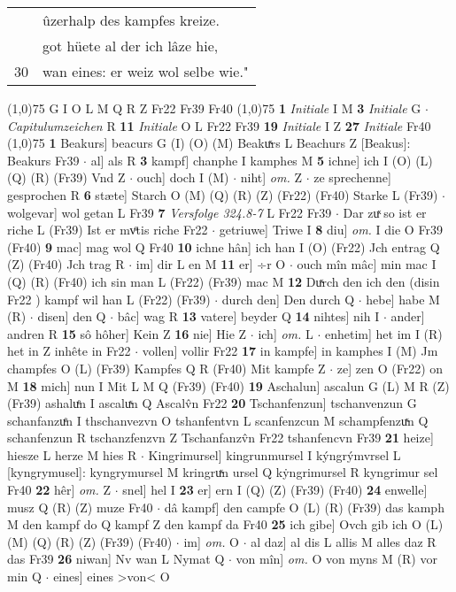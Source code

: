 \documentclass[8pt,a4paper,notitlepage]{article}
\begin{document}
\begin{table}[ht]
\begin{minipage}[t]{0.5\linewidth}
\begin{tabular}{rl}
 & ûzerhalp des kampfes kreize.\\ 
 & got hüete al der ich lâze hie,\\ 
30 & wan eines: er weiz wol selbe wie."\\ 
\end{tabular}
\scriptsize
\line(1,0){75} \newline
G I O L M Q R Z Fr22 Fr39 Fr40 \newline
\line(1,0){75} \newline
\textbf{1} \textit{Initiale} I M  \textbf{3} \textit{Initiale} G   $\cdot$ \textit{Capitulumzeichen} R  \textbf{11} \textit{Initiale} O L Fr22 Fr39  \textbf{19} \textit{Initiale} I Z  \textbf{27} \textit{Initiale} Fr40  \newline
\line(1,0){75} \newline
\textbf{1} Beakurs] beacurs G (I) (O) (M) Beakuͯrs L Beachurs Z [Beakus]: Beakurs Fr39  $\cdot$ al] als R \textbf{3} kampf] chanphe I kamphes M \textbf{5} ichne] ich I (O) (L) (Q) (R) (Fr39) Vnd Z  $\cdot$ ouch] doch I (M)  $\cdot$ niht] \textit{om.} Z  $\cdot$ ze sprechenne] gesprochen R \textbf{6} stæte] Starch O (M) (Q) (R) (Z) (Fr22) (Fr40) Starke L (Fr39)  $\cdot$ wolgevar] wol getan L Fr39 \textbf{7} \textit{Versfolge 324.8-7} L Fr22 Fr39   $\cdot$ Dar zuͯ so ist er riche L (Fr39) Ist er mvͦtis riche Fr22  $\cdot$ getriuwe] Triwe I \textbf{8} diu] \textit{om.} I die O Fr39 (Fr40) \textbf{9} mac] mag wol Q Fr40 \textbf{10} ichne hân] ich han I (O) (Fr22) Jch entrag Q (Z) (Fr40) Jch trag R  $\cdot$ im] dir L en M \textbf{11} er] ÷r O  $\cdot$ ouch mîn mâc] min mac I (Q) (R) (Fr40) ich sin man L (Fr22) (Fr39) mac M \textbf{12} Duͯrch den ich den (disin Fr22 ) kampf wil han L (Fr22) (Fr39)  $\cdot$ durch den] Den durch Q  $\cdot$ hebe] habe M (R)  $\cdot$ disen] den Q  $\cdot$ bâc] wag R \textbf{13} vatere] beyder Q \textbf{14} nihtes] nih I  $\cdot$ ander] andren R \textbf{15} sô hôher] Kein Z \textbf{16} nie] Hie Z  $\cdot$ ich] \textit{om.} L  $\cdot$ enhetim] het im I (R) het in Z inhête in Fr22  $\cdot$ vollen] vollir Fr22 \textbf{17} in kampfe] in kamphes I (M) Jm champfes O (L) (Fr39) Kampfes Q R (Fr40) Mit kampfe Z  $\cdot$ ze] zen O (Fr22) on M \textbf{18} mich] nun I Mit L M Q (Fr39) (Fr40) \textbf{19} Aschalun] ascalun G (L) M R (Z) (Fr39) ashaluͤn I ascaluͯn Q Ascalv̂n Fr22 \textbf{20} Tschanfenzun] tschanvenzun G schanfanzuͤn I thschanvezvn O tshanfentvn L scanfenzcun M schampfenzuͯn Q schanfenzun R tschanzfenzvn Z Tschanfanzv̂n Fr22 tshanfencvn Fr39 \textbf{21} heize] hiesze L herze M hies R  $\cdot$ Kingrimursel] kingrunmursel I kýngrýmvrsel L [kyngrymusel]: kyngrymursel M kringruͯn ursel Q kẏngrimursel R kyngrimur sel Fr40 \textbf{22} hêr] \textit{om.} Z  $\cdot$ snel] hel I \textbf{23} er] ern I (Q) (Z) (Fr39) (Fr40) \textbf{24} enwelle] musz Q (R) (Z) muze Fr40  $\cdot$ dâ kampf] den campfe O (L) (R) (Fr39) das kamph M den kampf do Q kampf Z den kampf da Fr40 \textbf{25} ich gibe] Ovch gib ich O (L) (M) (Q) (R) (Z) (Fr39) (Fr40)  $\cdot$ im] \textit{om.} O  $\cdot$ al daz] al dis L allis M alles daz R das Fr39 \textbf{26} niwan] Nv wan L Nymat Q  $\cdot$ von mîn] \textit{om.} O von myns M (R) vor min Q  $\cdot$ eines] eines >von< O 
\end{minipage}
\end{table}
\end{document}
